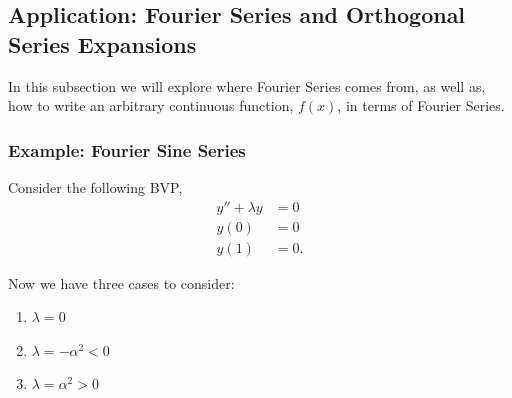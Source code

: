 \subsection{Application: Fourier Series and Orthogonal Series Expansions}

In this subsection we will explore where Fourier Series comes from, as well as, how to write an arbitrary continuous function, $f(x)$, in terms of Fourier Series. 

\subsubsection{Example: Fourier Sine Series}

Consider the following BVP, 
\begin{align}
y'' + \lambda y &= 0 \\ 
y(0) &= 0 \\
y(1) & = 0.
\end{align}

Now we have three cases to consider:
\begin{enumerate}
\item $\lambda = 0$
\item $\lambda = -\alpha^2 < 0$
\item $\lambda = \alpha^2 > 0$
\end{enumerate}

